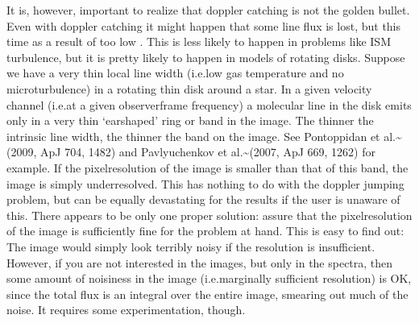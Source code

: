 \documentclass[letterpaper,10pt,english]{sphinxmanual}
\begin{document}
It is, however, important to realize that doppler catching is not the golden
bullet. Even with doppler catching it might happen that some line flux is lost,
but this time as a result of too low . This is less likely to
happen in problems like ISM turbulence, but it is pretty likely to happen in
models of rotating disks. Suppose we have a very thin local line width (i.e.low gas temperature and no microturbulence) in a rotating thin disk around a
star. In a given velocity channel (i.e.at a given observer\sphinxhyphen{}frame frequency) a
molecular line in the disk emits only in a very thin ‘ear\sphinxhyphen{}shaped’ ring or band
in the image. The thinner the intrinsic line width, the thinner the band on the
image. See Pontoppidan et al.\textasciitilde{}(2009, ApJ 704, 1482) and Pavlyuchenkov et
al.\textasciitilde{}(2007, ApJ 669, 1262) for example. If the pixel\sphinxhyphen{}resolution of the image is
smaller than that of this band, the image is simply underresolved.  This has
nothing to do with the doppler jumping problem, but can be equally devastating
for the results if the user is unaware of this. There appears to be only one
proper solution: assure that the pixel\sphinxhyphen{}resolution of the image is sufficiently
fine for the problem at hand. This is easy to find out: The image would simply
look terribly noisy if the resolution is insufficient. However, if you are not
interested in the images, but only in the spectra, then some amount of noisiness
in the image (i.e.marginally sufficient resolution) is OK, since the total
flux is an integral over the entire image, smearing out much of the noise.  It
requires some experimentation, though.
\end{document}
